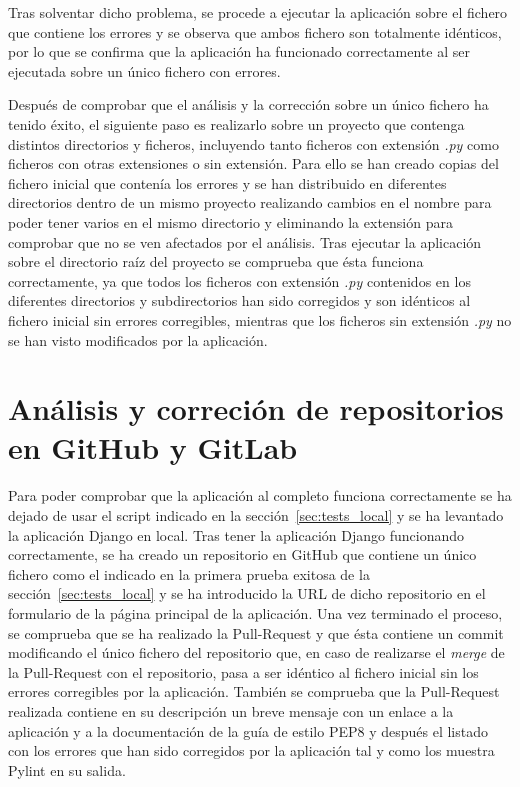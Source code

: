 \documentclass[a4paper, 12pt]{book}
\begin{document}
Tras solventar dicho problema, se procede a ejecutar la aplicación sobre el fichero que contiene los errores y se observa que ambos fichero son totalmente idénticos, por lo que se confirma que la aplicación ha funcionado correctamente al ser ejecutada sobre un único fichero con errores.

Después de comprobar que el análisis y la corrección sobre un único fichero ha tenido éxito, el siguiente paso es realizarlo sobre un proyecto que contenga distintos directorios y ficheros, incluyendo tanto ficheros con extensión \textit{.py} como ficheros con otras extensiones o sin extensión.
Para ello se han creado copias del fichero inicial que contenía los errores y se han distribuido en diferentes directorios dentro de un mismo proyecto realizando cambios en el nombre para poder tener varios en el mismo directorio y eliminando la extensión para comprobar que no se ven afectados por el análisis.
Tras ejecutar la aplicación sobre el directorio raíz del proyecto se comprueba que ésta funciona correctamente, ya que todos los ficheros con extensión \textit{.py} contenidos en los diferentes directorios y subdirectorios han sido corregidos y son idénticos al fichero inicial sin errores corregibles, mientras que los ficheros sin extensión \textit{.py} no se han visto modificados por la aplicación.

\section{Análisis y correción de repositorios en GitHub y GitLab}
\label{sec:tests_repositorios}

Para poder comprobar que la aplicación al completo funciona correctamente se ha dejado de usar el script indicado en la sección~\ref{sec:tests_local} y se ha levantado la aplicación Django en local.
Tras tener la aplicación Django funcionando correctamente, se ha creado un repositorio en GitHub que contiene un único fichero como el indicado en la primera prueba exitosa de la sección~\ref{sec:tests_local} y se ha introducido la URL de dicho repositorio en el formulario de la página principal de la aplicación.
Una vez terminado el proceso, se comprueba que se ha realizado la Pull-Request y que ésta contiene un commit modificando el único fichero del repositorio que, en caso de realizarse el \textit{merge} de la Pull-Request con el repositorio, pasa a ser idéntico al fichero inicial sin los errores corregibles por la aplicación. También se comprueba que la Pull-Request realizada contiene en su descripción un breve mensaje con un enlace a la aplicación y a la documentación de la guía de estilo PEP8 y después el listado con los errores que han sido corregidos por la aplicación tal y como los muestra Pylint en su salida.
\end{document}

